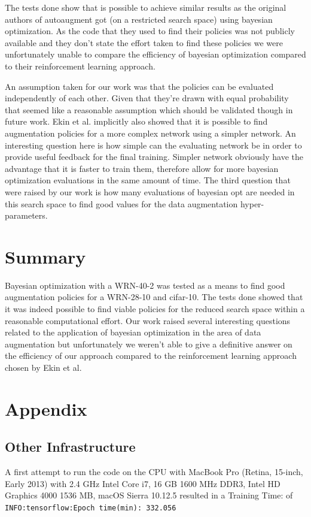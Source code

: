 \documentclass[10pt,twocolumn,letterpaper]{article}
\begin{document}
The tests done show that is possible to achieve similar results as the original authors of autoaugment got (on a restricted search space) using bayesian optimization. As the code that they used to find their policies was not publicly available and they don't state the effort taken to find these policies we were unfortunately unable to compare the efficiency of bayesian optimization compared to their reinforcement learning approach.
\par
An assumption taken for our work was that the policies can be evaluated independently of each other. Given that they're drawn with equal probability that seemed like a reasonable assumption which should be validated though in future work. Ekin et al. implicitly also showed that it is possible to find augmentation policies for a more complex network using a simpler network. An interesting question here is how simple can the evaluating network be in order to provide useful feedback for the final training. Simpler network obviously have the advantage that it is faster to train them, therefore allow for more bayesian optimization evaluations in the same amount of time. The third question that were raised by our work is how many evaluations of bayesian opt are needed in this search space to find good values for the data augmentation hyper-parameters.

\section{Summary}

Bayesian optimization with a WRN-40-2 was tested as a means to find good augmentation policies for a WRN-28-10 and cifar-10. The tests done showed that it was indeed possible to find viable policies for the reduced search space within a reasonable computational effort. Our work raised several interesting questions related to the application of bayesian optimization in the area of data augmentation but unfortunately we weren't able to give a definitive answer on the efficiency of our approach compared to the reinforcement learning approach chosen by Ekin et al.


\section{Appendix}

\subsection{Other Infrastructure}
A first attempt to run the code on the CPU with MacBook Pro (Retina, 15-inch, Early 2013) with 2.4 GHz Intel Core i7, 16 GB 1600 MHz DDR3, Intel HD Graphics 4000 1536 MB, macOS Sierra 10.12.5 resulted in a Training Time: of \texttt{INFO:tensorflow:Epoch time(min): 332.056} \newline
\end{document}
